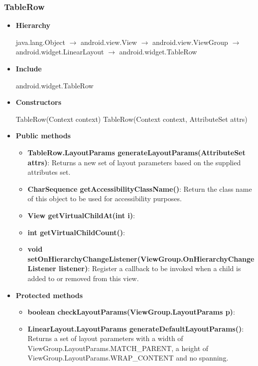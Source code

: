 \documentclass{report}
\begin{document}
    \subsubsection{TableRow}
    \begin{itemize}
        \item \textbf{Hierarchy}
            \begin{center}
                java.lang.Object $\to$	android.view.View $\to$	android.view.ViewGroup $\to$	android.widget.LinearLayout $\to$	android.widget.TableRow
            \end{center}
        \item \textbf{Include}
            \bigbreak \noindent 
            \begin{javacode}
            android.widget.TableRow
            \end{javacode}
        \item \textbf{Constructors}
            \bigbreak \noindent 
            \begin{javacode}
                TableRow(Context context)
                TableRow(Context context, AttributeSet attrs)
            \end{javacode}
        \item \textbf{Public methods}
            \begin{itemize}
                \item \textbf{TableRow.LayoutParams	generateLayoutParams(AttributeSet attrs)}: Returns a new set of layout parameters based on the supplied attributes set.
                \item \textbf{CharSequence	getAccessibilityClassName()}: Return the class name of this object to be used for accessibility purposes.
                \item \textbf{View	getVirtualChildAt(int i)}:
                \item \textbf{int	getVirtualChildCount()}:
                \item \textbf{void	setOnHierarchyChangeListener(ViewGroup.OnHierarchyChangeListener listener)}: Register a callback to be invoked when a child is added to or removed from this view.
            \end{itemize}
        \item \textbf{Protected methods}
            \begin{itemize}
                \item \textbf{boolean	checkLayoutParams(ViewGroup.LayoutParams p)}:
                \item \textbf{LinearLayout.LayoutParams	generateDefaultLayoutParams()}: Returns a set of layout parameters with a width of ViewGroup.LayoutParams.MATCH\_PARENT, a height of ViewGroup.LayoutParams.WRAP\_CONTENT and no spanning.

\end{itemize}
\end{itemize}
\end{document}
